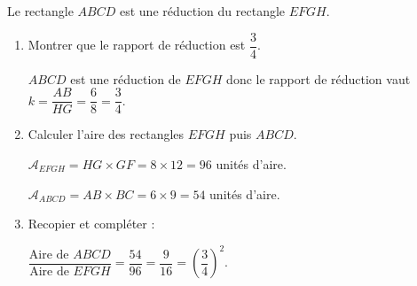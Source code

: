     Le rectangle $ABCD$ est une réduction du rectangle $EFGH$.


    \begin{enumerate}
        \item Montrer que le rapport de réduction est $\dfrac{3}{4}$.

        {\color{red} $ABCD$ est une réduction de $EFGH$ donc le rapport de réduction vaut $k=\dfrac{AB}{HG}=\dfrac{6}{8}=\dfrac{3}{4}$.}
        \item Calculer l'aire des rectangles $EFGH$ puis $ABCD$.

        {\color{red}$\mathcal{A}_{EFGH}=HG\times GF=8\times 12 = 96$ unités d'aire.

        $\mathcal{A}_{ABCD}=AB\times BC=6\times 9 = 54$ unités d'aire.
        }
        \item Recopier et compléter :

        {\color{red}$\dfrac{\text{Aire de $ABCD$}}{\text{Aire de $EFGH$}}=\dfrac{54}{96}=\dfrac{9}{16}=\left(\dfrac{3}{4}\right)^2$.}
    \end{enumerate}
